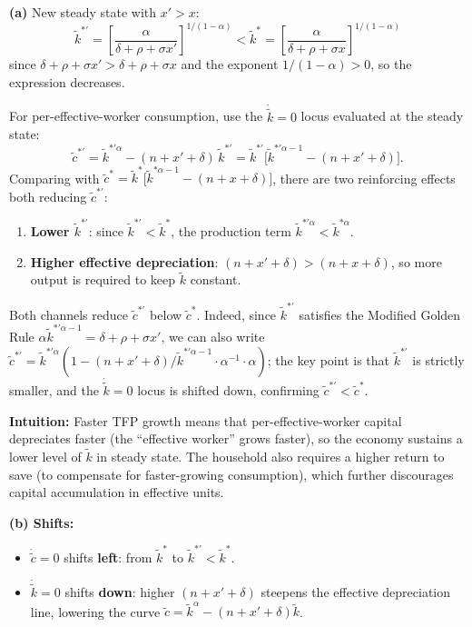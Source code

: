 \documentclass[a4paper,11pt]{article}
\newcommand{\ktilde}{\tilde{k}}
\newcommand{\ctilde}{\tilde{c}}
\begin{document}
\begin{answerbox}
\textbf{(a)} New steady state with $x' > x$:
\[
    \ktilde^{*\prime} = \left[\frac{\alpha}{\delta + \rho + \sigma x'}
    \right]^{1/(1-\alpha)} < \ktilde^*
    = \left[\frac{\alpha}{\delta + \rho + \sigma x}\right]^{1/(1-\alpha)}
\]
since $\delta + \rho + \sigma x' > \delta + \rho + \sigma x$ and the exponent
$1/(1-\alpha) > 0$, so the expression decreases.

For per-effective-worker consumption, use the $\dot{\ktilde}=0$ locus evaluated at the
steady state:
\[
    \ctilde^{*\prime} = \ktilde^{*\prime\alpha} - (n+x'+\delta)\,\ktilde^{*\prime}
    = \ktilde^{*\prime}\bigl[\ktilde^{*\prime\alpha-1} - (n+x'+\delta)\bigr].
\]
Comparing with $\ctilde^* = \ktilde^*\bigl[\ktilde^{*\alpha-1} - (n+x+\delta)\bigr]$,
there are two reinforcing effects both reducing $\ctilde^{*\prime}$:
\begin{enumerate}[label=(\roman*), itemsep=2pt]
    \item \textbf{Lower $\ktilde^{*\prime}$}: since $\ktilde^{*\prime} < \ktilde^*$,
    the production term $\ktilde^{*\prime\alpha} < \ktilde^{*\alpha}$.
    \item \textbf{Higher effective depreciation}: $(n+x'+\delta) > (n+x+\delta)$,
    so more output is required to keep $\ktilde$ constant.
\end{enumerate}
Both channels reduce $\ctilde^{*\prime}$ below $\ctilde^*$.  Indeed, since $\ktilde^{*\prime}$
satisfies the Modified Golden Rule $\alpha\ktilde^{*\prime\alpha-1} = \delta+\rho+\sigma x'$,
we can also write $\ctilde^{*\prime} = \ktilde^{*\prime\alpha}(1 - (n+x'+\delta)/
\ktilde^{*\prime\alpha-1}\cdot\alpha^{-1}\cdot\alpha)$; the key point is that $\ktilde^{*\prime}$
is strictly smaller, and the $\dot{\ktilde}=0$ locus is shifted down, confirming
$\ctilde^{*\prime} < \ctilde^*$.

\textbf{Intuition:} Faster TFP growth means that per-effective-worker capital depreciates
faster (the ``effective worker'' grows faster), so the economy sustains a lower level
of $\ktilde$ in steady state.  The household also requires a higher return to save (to
compensate for faster-growing consumption), which further discourages capital accumulation
in effective units.

\textbf{(b) Shifts:}
\begin{itemize}
    \item $\dot{\ctilde}=0$ shifts \textbf{left}: from $\ktilde^*$ to
    $\ktilde^{*\prime} < \ktilde^*$.
    \item $\dot{\ktilde}=0$ shifts \textbf{down}: higher $(n+x'+\delta)$ steepens the
    effective depreciation line, lowering the curve
    $\ctilde = \ktilde^{\alpha} - (n+x'+\delta)\ktilde$.
\end{itemize}


\end{answerbox}
\end{document}
